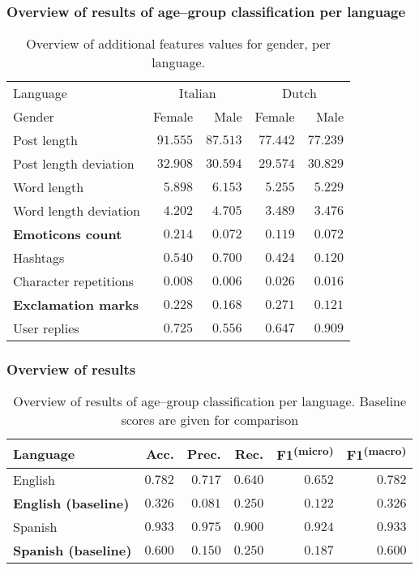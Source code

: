 \documentclass[utf8]{beamer}
\begin{document}
\begin{frame}
	\frametitle{Overview of results of age–group classification per language}
	\begin{table}
		\caption{Overview of additional features values for gender, per language.}
		\label{tab:additionalfeatures-gender}
		\begin{center}
			\begin{tabular}{l|rr|rr}
				\toprule
				Language & \multicolumn{2}{c}{Italian} & \multicolumn{2}{|c}{Dutch} \\
				Gender & Female & Male & Female & Male \\
				\midrule
				Post length & $ 91.555 $ & $ 87.513 $ & $ 77.442 $ & $ 77.239 $ \\
				Post length deviation & $ 32.908 $ & $ 30.594 $ & $ 29.574 $ & $ 30.829 $ \\
				Word length & $ 5.898 $ & $ 6.153 $ & $ 5.255 $ & $ 5.229 $ \\
				Word length deviation & $ 4.202 $ & $ 4.705 $ & $ 3.489 $ & $ 3.476 $ \\
				\textbf{Emoticons count} & $ 0.214 $ & $ 0.072 $ & $ 0.119 $ & $ 0.072 $ \\
				Hashtags & $ 0.540 $ & $ 0.700 $ & $ 0.424 $ & $ 0.120 $ \\
				Character repetitions & $ 0.008 $ & $ 0.006 $ & $ 0.026 $ & $ 0.016 $ \\
				\textbf{Exclamation marks} & $ 0.228 $ & $ 0.168 $ & $ 0.271 $ & $ 0.121 $ \\
				User replies & $ 0.725 $ & $ 0.556 $ & $ 0.647 $ & $ 0.909 $ \\
				\bottomrule
			\end{tabular}
		\end{center}
	\end{table}
\end{frame}

\begin{frame}
	\frametitle{Overview of results}
	\begin{table}
		\caption{Overview of results of age--group classification per language. Baseline scores are given for comparison}
		\label{tab:scores-age}
		\begin{center}
			\begin{tabular}{l|rrrrr}
				\toprule
				Language & Acc. & Prec. & Rec. & F1\textsuperscript{(micro)} & F1\textsuperscript{(macro)} \\
				\midrule
				English & $ 0.782 $ & $ 0.717 $ & $ 0.640 $ & $ 0.652 $ & $ 0.782 $ \\
				\textbf{English (baseline)} &$ 0.326 $ & $ 0.081 $ & $ 0.250 $ & $ 0.122 $ & $ 0.326 $ \\
				Spanish & $ 0.933 $ & $ 0.975 $ & $  0.900 $ & $ 0.924 $ & $ 0.933 $ \\
				\textbf{Spanish (baseline)} & $  0.600 $ & $  0.150 $ & $  0.250 $ & $ 0.187 $ & $  0.600 $ \\
				\bottomrule
			\end{tabular}
		\end{center}
	\end{table}
\end{frame}
\end{document}
